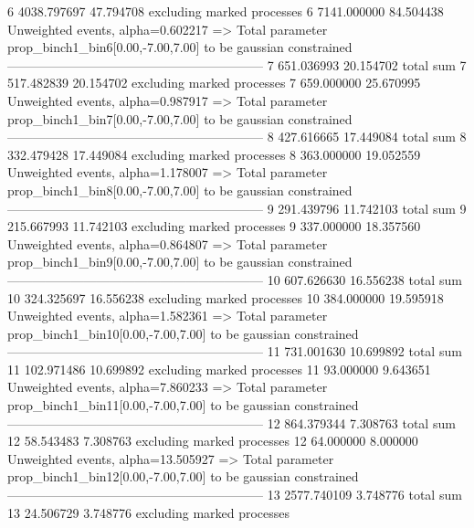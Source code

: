 6          4038.797697     47.794708       excluding marked processes    
6          7141.000000     84.504438       Unweighted events, alpha=0.602217
  => Total parameter prop_binch1_bin6[0.00,-7.00,7.00] to be gaussian constrained
------------------------------------------------------------
7          651.036993      20.154702       total sum                     
7          517.482839      20.154702       excluding marked processes    
7          659.000000      25.670995       Unweighted events, alpha=0.987917
  => Total parameter prop_binch1_bin7[0.00,-7.00,7.00] to be gaussian constrained
------------------------------------------------------------
8          427.616665      17.449084       total sum                     
8          332.479428      17.449084       excluding marked processes    
8          363.000000      19.052559       Unweighted events, alpha=1.178007
  => Total parameter prop_binch1_bin8[0.00,-7.00,7.00] to be gaussian constrained
------------------------------------------------------------
9          291.439796      11.742103       total sum                     
9          215.667993      11.742103       excluding marked processes    
9          337.000000      18.357560       Unweighted events, alpha=0.864807
  => Total parameter prop_binch1_bin9[0.00,-7.00,7.00] to be gaussian constrained
------------------------------------------------------------
10         607.626630      16.556238       total sum                     
10         324.325697      16.556238       excluding marked processes    
10         384.000000      19.595918       Unweighted events, alpha=1.582361
  => Total parameter prop_binch1_bin10[0.00,-7.00,7.00] to be gaussian constrained
------------------------------------------------------------
11         731.001630      10.699892       total sum                     
11         102.971486      10.699892       excluding marked processes    
11         93.000000       9.643651        Unweighted events, alpha=7.860233
  => Total parameter prop_binch1_bin11[0.00,-7.00,7.00] to be gaussian constrained
------------------------------------------------------------
12         864.379344      7.308763        total sum                     
12         58.543483       7.308763        excluding marked processes    
12         64.000000       8.000000        Unweighted events, alpha=13.505927
  => Total parameter prop_binch1_bin12[0.00,-7.00,7.00] to be gaussian constrained
------------------------------------------------------------
13         2577.740109     3.748776        total sum                     
13         24.506729       3.748776        excluding marked processes    
